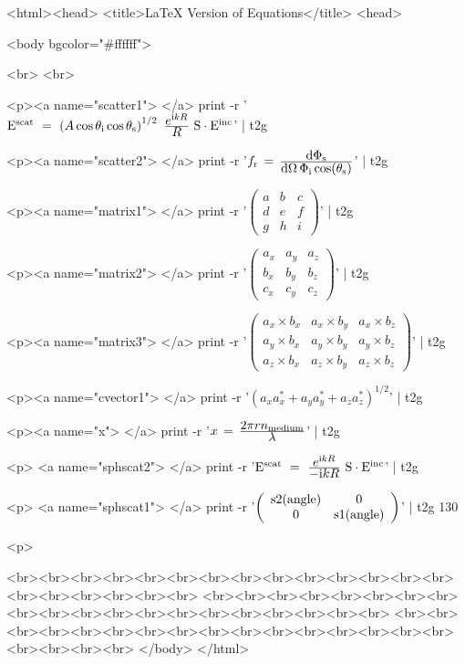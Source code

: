 <html><head>
<title>LaTeX Version of Equations</title>
<head>

<body bgcolor="#ffffff">

\usepackage{pifont}<br>
<br>

<p><a name="scatter1"> </a>
print -r '${\rm E}^{\rm scat} ~=~ 
\left(A\cos\theta_{\rm i}\cos\theta_{\rm s}\right)^{1/2} ~ 
\frac{\textstyle {e^{{\rm i}kR}}}{\textstyle R} 
~ {\rm S} \cdot {\rm E}^{\rm inc} $' | t2g

<p><a name="scatter2"> </a>
print -r '$ f_{\rm r} \, = \, \frac{\textstyle{{\rm d}\Phi_{\rm s}}}
{\textstyle{{\rm d}\Omega \, \Phi_{\rm i} \cos(\theta_{\rm s})}}$' | t2g

<p><a name="matrix1"> </a>
print -r '$  \left( \begin{array}{ccc} 
a&b&c \\ d&e&f \\ g&h&i \end{array} \right) $' | t2g

<p><a name="matrix2"> </a>
print -r '$  \left( \begin{array}{ccc} 
a_x & a_y & a_z \\ b_x & b_y & b_z \\
c_x & c_y & c_z \end{array} \right) $' | t2g

<p><a name="matrix3"> </a>
print -r '$  \left( \begin{array}{ccc} 
a_x \times b_x & a_x \times b_y & a_x \times b_z \\
a_y \times b_x & a_y \times b_y & a_y \times b_z \\
a_z \times b_x & a_z \times b_y & a_z \times b_z
\end{array} \right) $' | t2g

<p><a name="cvector1"> </a>
print -r '$ \left(a_x a_x^* + a_y a_y^* + a_z a_z^*\right)^{1/2} $' | t2g

<p><a name="x"> </a>
print -r '$ x \, = \, \frac{\textstyle{2\pi r n_{\rm medium} }}{\textstyle\lambda}  
$' | t2g

<p>
<a name="sphscat2"> </a>
print -r '${\rm E}^{\rm scat} ~=~ 
\frac{\textstyle {e^{{\rm i}kR}}}{\textstyle -{\rm i}kR} 
~ {\rm S} \cdot {\rm E}^{\rm inc} $' | t2g

<p>
<a name="sphscat1"> </a>
print -r '$\left( \begin{array}{cc}
{\rm s2(angle)} & 0\\
  0 & {\rm s1(angle)} \end{array} \right) $' | t2g 130

<p>



<br><br><br><br><br><br><br><br><br><br><br><br><br><br><br><br><br><br><br><br>
<br><br><br><br><br><br><br><br><br><br><br><br><br><br><br><br><br><br><br><br>
<br><br><br><br><br><br><br><br><br><br><br><br><br><br><br><br><br><br><br><br>
</body>
</html>








